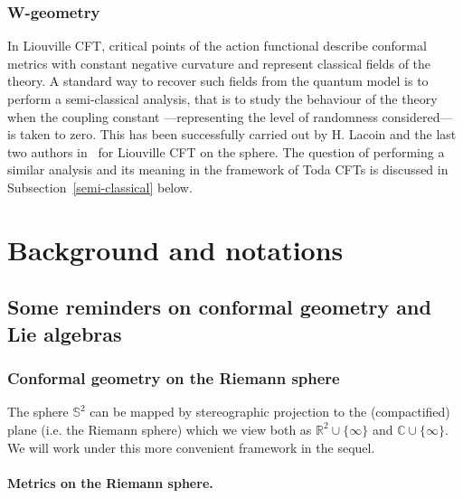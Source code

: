 \documentclass[10pt]{amsart}
\theoremstyle{definition}\newtheorem{defi}[theo]{Definition}\newtheorem{rema}[theo]{Remark}\newtheorem{exam}[theo]{Example}\newtheorem{exem}[theo]{Example}\newtheorem{nota}[theo]{Notation}
\newcommand{\C}{\mathbb{C}}
\newcommand{\R}{\mathbb{R}}
\renewcommand*\S{\mathbb{S}}
\begin{document}
\subsubsection*{W-geometry}
 In Liouville CFT, critical points of the action functional describe conformal metrics with constant negative curvature and represent classical fields of the theory. A standard way to recover such fields from the quantum model is to perform a semi-classical analysis, that is to study the behaviour of the theory when the coupling constant ---representing the level of randomness considered--- is taken to zero. This has been successfully carried out by H. Lacoin and the last two authors in~\cite{LRV19} for Liouville CFT on the sphere. The question of performing a similar analysis and its meaning in the framework of Toda CFTs is discussed in Subsection~\ref{semi-classical} below.


\section{Background and notations}\label{section_background}



\subsection{Some reminders on conformal geometry and Lie algebras}


\subsubsection{Conformal geometry on the Riemann sphere}

The sphere $\S^2$ can be mapped by stereographic projection to the (compactified) plane (i.e. the Riemann sphere) which we view both as ${\R^2}\cup\lbrace\infty\rbrace$ and $\C\cup\lbrace\infty\rbrace$. We will work under this more convenient framework in the sequel.

\paragraph{Metrics on the Riemann sphere.}
\end{document}
